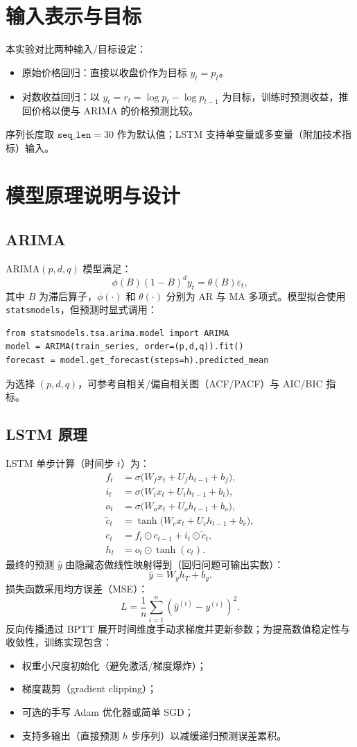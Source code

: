 \section{输入表示与目标}
本实验对比两种输入/目标设定：
\begin{itemize}
    \item 原始价格回归：直接以收盘价作为目标 $y_t=p_t$。
    \item 对数收益回归：以 $y_t=r_t=\log p_t-\log p_{t-1}$ 为目标，训练时预测收益，推回价格以便与 ARIMA 的价格预测比较。
\end{itemize}
序列长度取 $\texttt{seq\_len}=30$ 作为默认值；LSTM 支持单变量或多变量（附加技术指标）输入。

\section{模型原理说明与设计}
\subsection{ARIMA}
ARIMA$(p,d,q)$ 模型满足：
$$\phi(B)(1-B)^d y_t = \theta(B)\varepsilon_t,$$
其中 $B$ 为滞后算子，$\phi(\cdot)$ 和 $\theta(\cdot)$ 分别为 AR 与 MA 多项式。模型拟合使用 \texttt{statsmodels}，但预测时显式调用：
\begin{lstlisting}[style=cleanpython]
from statsmodels.tsa.arima.model import ARIMA
model = ARIMA(train_series, order=(p,d,q)).fit()
forecast = model.get_forecast(steps=h).predicted_mean
\end{lstlisting}
为选择 $(p,d,q)$，可参考自相关/偏自相关图（ACF/PACF）与 AIC/BIC 指标。

\subsection{LSTM 原理}
LSTM 单步计算（时间步 $t$）为：
\begin{align*}
f_t &= \sigma\bigl(W_f x_t + U_f h_{t-1} + b_f\bigr),\\
i_t &= \sigma\bigl(W_i x_t + U_i h_{t-1} + b_i\bigr),\\
o_t &= \sigma\bigl(W_o x_t + U_o h_{t-1} + b_o\bigr),\\
\tilde c_t &= \tanh\bigl(W_c x_t + U_c h_{t-1} + b_c\bigr),\\
c_t &= f_t \odot c_{t-1} + i_t \odot \tilde c_t,\\
h_t &= o_t \odot \tanh(c_t).
\end{align*}
最终的预测 $\hat y$ 由隐藏态做线性映射得到（回归问题可输出实数）：
$$\hat y = W_y h_T + b_y.$$ 
损失函数采用均方误差（MSE）：
$$L=\frac{1}{n}\sum_{i=1}^n (\hat y^{(i)}-y^{(i)})^2.$$ 
反向传播通过 BPTT 展开时间维度手动求梯度并更新参数；为提高数值稳定性与收敛性，训练实现包含：
\begin{itemize}
    \item 权重小尺度初始化（避免激活/梯度爆炸）；
    \item 梯度裁剪（gradient clipping）；
    \item 可选的手写 Adam 优化器或简单 SGD；
    \item 支持多输出（直接预测 $h$ 步序列）以减缓递归预测误差累积。
\end{itemize}

